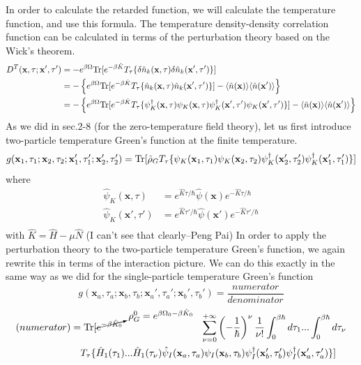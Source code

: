  In order to calculate the retarded function, we will calculate the temperature function, and use this formula.
 The temperature density-density correlation function can be calculated in terms of the perturbation theory based on the Wick's theorem.
\[
\begin{aligned}
D^T(\mathbf x,\tau;\mathbf x',\tau')&=-e^{\beta\Omega}\text{Tr}[e^{-\beta \hat K}T_\tau\{ \delta \hat n_k(\mathbf x ,\tau)\delta \hat n_k(\mathbf x' ,\tau') \}]\\
&=-\left\{e^{\beta\Omega}\text{Tr}[e^{-\beta \hat K}T_\tau\{ \hat n_k(\mathbf x ,\tau)\hat n_k(\mathbf x' ,\tau') \}] -\langle \hat n(\mathbf x)\rangle \langle \hat n (\mathbf x')\rangle \right\}\\
&=-\left\{e^{\beta\Omega}\text{Tr}[e^{-\beta \hat K}T_\tau\{ \psi_K^\dag(\mathbf x,\tau)\psi_K(\mathbf x,\tau) \psi_K^\dag(\mathbf x',\tau')\psi_K(\mathbf x',\tau') \}] -\langle \hat n(\mathbf x)\rangle \langle \hat n (\mathbf x')\rangle \right\}
\end{aligned}
\]
As we did in sec.2-8 (for the zero-temperature field theory), let us first introduce two-particle temperature Green's function at the finite temperature.
\begin{equation}
g(\mathbf x_1,\tau_1;\mathbf x_2,\tau_2;\mathbf x_1',\tau_1';\mathbf x_2',\tau_2')=\text{Tr} [\hat \rho_G T_\tau\{\psi_K(\mathbf x_1,\tau_1)\psi_K(\mathbf x_2,\tau_2)\psi_K^\dag(\mathbf x_2',\tau_2')\psi_K^\dag(\mathbf x_1',\tau_1')\}]
\end{equation}
where
\[
\begin{aligned}
\hat \psi_K(\mathbf x ,\tau)&=e^{\hat K\tau/\hbar}\hat \psi(\mathbf x)e^{-\hat K\tau/\hbar}\\
\hat \psi_K(\mathbf x' ,\tau')&=e^{\hat K\tau'/\hbar}\hat \psi(\mathbf x')e^{-\hat K\tau'/\hbar}\\
\end{aligned}
\]
with $\hat K=\hat H-\mu \hat N$ (I can't see that clearly--Peng Pai)
 In order to apply the perturbation theory to the two-particle temperature Green's function, we again rewrite this in terms of the interaction picture.
 We can do this exactly in the same way as we did for the single-particle temperature Green's function
\[
g(\mathbf x_a,\tau_a;\mathbf x_b,\tau_b;\mathbf x_a',\tau_a';\mathbf x_b',\tau_b')=\frac{numerator}{denominator}
\]
\[
\begin{aligned}
(numerator)&=\text{Tr} [ \cancelto{\rho^0_G=e^{\beta\Omega_0-\beta\hat K_0}}{e^{-\beta\hat K_0}}\qquad \qquad\qquad\qquad\sum_{\nu=0}^{+\infty}\left( -\frac{1}{\hbar}\right)^\nu \frac{1}{\nu!}\int_0^{\beta\hbar}d\tau_1 ... \int_0^{\beta\hbar}d\tau_\nu\\
 &\quad T_\tau\{ \hat H_1(\tau_1)...\hat H_1(\tau_\nu) \hat\psi_I(\mathbf x_a,\tau_a) \psi_I(\mathbf x_b,\tau_b) \psi_I^\dag(\mathbf x_b',\tau_b') \psi_I^\dag(\mathbf x_a',\tau_a') \}  ]
\end{aligned}
\]
